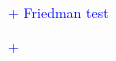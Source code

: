 \documentclass{llncs}
\begin{document}
\textcolor{blue}{+ Friedman test }

\textcolor{blue}{+ \cite{Gut:2009}}





% 






\end{document}
